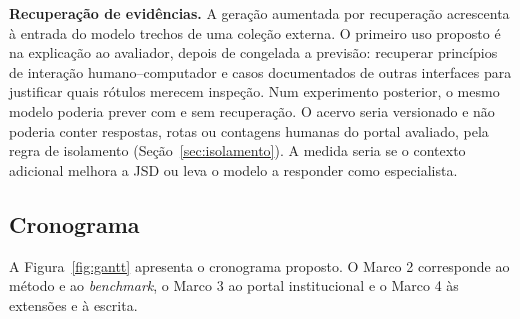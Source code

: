 \documentclass[12pt,oneside,a4paper,chapter=TITLE,english,brazil]{abntex2}
\begin{document}
\begin{planejado}
\textbf{Recuperação de evidências.} A geração aumentada por recuperação \cite{lewis2020rag} acrescenta à entrada do modelo trechos de uma coleção externa. O primeiro uso proposto é na explicação ao avaliador, depois de congelada a previsão: recuperar princípios de interação humano--computador e casos documentados de outras interfaces para justificar quais rótulos merecem inspeção. Num experimento posterior, o mesmo modelo poderia prever com e sem recuperação. O acervo seria versionado e não poderia conter respostas, rotas ou contagens humanas do portal avaliado, pela regra de isolamento (Seção~\ref{sec:isolamento}). A medida seria se o contexto adicional melhora a JSD ou leva o modelo a responder como especialista.
\end{planejado}

\subsection{Cronograma}
\label{sec:cronograma}

A Figura~\ref{fig:gantt} apresenta o cronograma proposto. O Marco 2 corresponde ao método e ao \textit{benchmark}, o Marco 3 ao portal institucional e o Marco 4 às extensões e à escrita.
\end{document}
